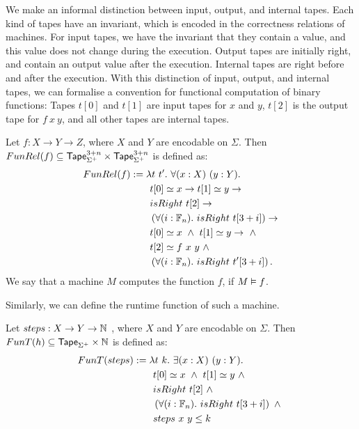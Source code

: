 We make an informal distinction between input, output, and internal tapes.  Each kind of tapes have an invariant, which is encoded in the correctness
relations of machines.  For input tapes, we have the invariant that they contain a value, and this value does not change during the execution.  Output
tapes are initially right, and contain an output value after the execution.  Internal tapes are right before and after the execution.  With this
distinction of input, output, and internal tapes, we can formalise a convention for functional computation of binary functions: Tapes $t[0]$ and
$t[1]$ are input tapes for $x$ and $y$, $t[2]$ is the output tape for $f~x~y$, and all other tapes are internal tapes.
\begin{definition}
  \label{def:Computes2_Rel}
  Let $f : X \to Y \to Z$, where $X$ and $Y$ are encodable on $\Sigma$.  Then
  $FunRel(f) \subseteq \mathsf{Tape}_{\Sigma^+}^{3+n} \times \mathsf{Tape}_{\Sigma^+}^{3+n}$ is defined as:
  \begin{alignat*}{2}
     FunRel(f) &:= \lambda t~t'.~\forall (x:X)~(y:Y). \\
    &\qquad t[0] \simeq x \rightarrow t[1] \simeq y \rightarrow \\
    &\qquad isRight~t[2] \rightarrow \\
    &\qquad \left(\forall (i:\mathbb{F}_n).~isRight~t[3+i] \right) \rightarrow \\
    &\qquad t[0] \simeq x ~\land~ t[1] \simeq y \rightarrow ~\land~ \\
    &\qquad t[2] \simeq f~x~y ~\land~ \\
    &\qquad \left(\forall (i:\mathbb{F}_n).~isRight~t'[3+i] \right).
  \end{alignat*}
  We say that a machine $M$ computes the function $f$, if $M \mathrel{\vDash} f$.
\end{definition}

Similarly, we can define the runtime function of such a machine.
\begin{definition}
  \label{def:Computes2_T}
  Let $steps : X \rightarrow Y \rightarrow \mathbb{N}$ , where $X$ and $Y$ are encodable on $\Sigma$.  Then $FunT(h) \subseteq \mathsf{Tape}_{\Sigma^+} \times \mathbb{N}$ is defined as:
  \begin{alignat*}{2}
     FunT(steps) &:= \lambda t~k.~\exists (x:X)~(y:Y). \\
    &\qquad t[0] \simeq x ~\land~ t[1] \simeq y ~\land~ \\
    &\qquad isRight~t[2] ~\land~ \\
    &\qquad \left(\forall (i:\mathbb{F}_n).~isRight~t[3+i] \right) ~\land~ \\
    &\qquad steps~x~y \leq k
  \end{alignat*}
\end{definition}

